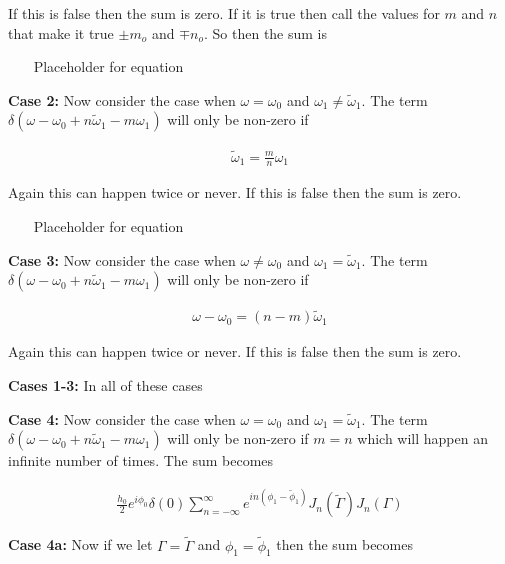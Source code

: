 \documentclass[onecolumn, groupedaddress, 10pt]{revtex4-1}
\begin{document}
If this is false then the sum is zero.  If it is true then call the values for $m$ and $n$ that make it true $\pm m_o$ and $\mp n_o$.  So then the sum is 


~~~ Placeholder for equation ~~~


\textbf{Case 2:}  Now consider the case when $\omega = \omega_0$ and $\omega_1 \neq \widetilde{\omega}_1$.  The term $\delta(\omega - \omega_0 + n\widetilde{\omega}_1 - m\omega_1)$ will only be non-zero if

\begin{align}
\widetilde{\omega}_1 = \frac{m}{n} \omega_1
\end{align}

Again this can happen twice or never.  If this is false then the sum is zero.


~~~ Placeholder for equation ~~~


\textbf{Case 3:}  Now consider the case when $\omega \neq \omega_0$ and $\omega_1 = \widetilde{\omega}_1$.  The term $\delta(\omega - \omega_0 + n\widetilde{\omega}_1 - m\omega_1)$ will only be non-zero if

\begin{align}
\omega - \omega_0 = (n-m)\widetilde{\omega}_1
\end{align}

Again this can happen twice or never.  If this is false then the sum is zero.


\textbf{Cases 1-3:}  In all of these cases

\textbf{Case 4:}  Now consider the case when $\omega = \omega_0$ and $\omega_1 = \widetilde{\omega}_1$.  The term $\delta(\omega - \omega_0 + n\widetilde{\omega}_1 - m\omega_1)$ will only be non-zero if $m=n$ which will happen an infinite number of times.  The sum becomes

\begin{align}
\frac{h_0}{2} e^{i\phi_0} \delta(0) \sum_{n=-\infty}^{\infty} e^{in(\phi_1-\widetilde{\phi}_1)} J_n(\widetilde{\Gamma}) J_n (\Gamma)
\end{align}

\textbf{Case 4a:} Now if we let $\Gamma = \widetilde{\Gamma}$ and $\phi_1 = \widetilde{\phi}_1$ then the sum becomes
\end{document}
